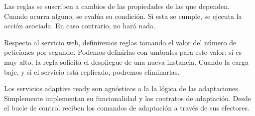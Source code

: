 Las reglas se suscriben a cambios de las propiedades de las que dependen. Cuando ocurra alguno, se evalúa su condición. Si esta se cumple, se ejecuta la acción asociada. En caso contrario, no hará nada.

Respecto al servicio web, definiremos reglas tomando el valor del número de peticiones por segundo. Podemos definirlas con umbrales para este valor: si es muy alto, la regla solicita el despliegue de una nueva instancia. Cuando la carga baje, y si el servicio está replicado, podremos eliminarlas.


Los servicios adaptive ready son agnósticos a la la lógica de las adaptaciones. Simplemente implementan su funcionalidad y los contratos de adaptación. Desde el bucle de control reciben los comandos de adaptación a través de sus efectores.

